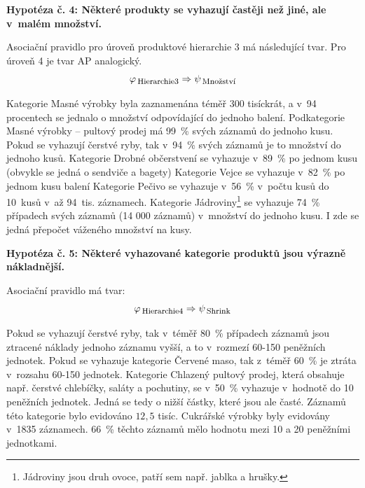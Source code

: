 
\textbf{Hypotéza č. 4: Některé produkty se vyhazují častěji než jiné, ale v~malém množství.}

Asociační pravidlo pro úroveň produktové hierarchie 3 má následující tvar. Pro úroveň 4 je tvar AP analogický.
\begin{equation}
    \varphi_{\mbox{\,\footnotesize Hierarchie3}} \Rightarrow \psi_{\mbox{\,\footnotesize Množství}}
\end{equation}

Kategorie Masné výrobky byla zaznamenána téměř 300 tisíckrát, a v~94 procentech se jednalo o množství odpovídající do jednoho balení. Podkategorie Masné výrobky -- pultový prodej má 99~\% svých záznamů do jednoho kusu.
Pokud se vyhazují čerstvé ryby, tak v~94~\% svých záznamů je to množství do jednoho kusů. Kategorie Drobné občerstvení %
 se vyhazuje v~89~\% po jednom kusu (obvykle se jedná o sendviče a bagety)
Kategorie Vejce se vyhazuje v~82~\% po jednom kusu balení
Kategorie Pečivo se vyhazuje v~56~\% v~počtu kusů do 10~kusů v~až 94~tis. záznamech.
Kategorie Jádroviny\footnote{Jádroviny jsou druh ovoce, patří sem např. jablka a hrušky.} se vyhazuje 74~\% případech svých záznamů (14 000 záznamů) v~množství do jednoho kusu. I zde se jedná přepočet váženého množství na kusy.

\vspace*{1em}

\textbf{Hypotéza č. 5: Některé vyhazované kategorie produktů jsou výrazně nákladnější.}

Asociační pravidlo má tvar:
\begin{equation}
    \varphi_{\mbox{\,\footnotesize Hierarchie4}} \Rightarrow \psi_{\mbox{\,\footnotesize Shrink}}
\end{equation}

Pokud se vyhazují čerstvé ryby, tak v~téměř 80~\% případech záznamů jsou ztracené náklady jednoho záznamu vyšší, a to v~rozmezí 60-150 peněžních jednotek.
Pokud se vyhazuje kategorie Červené maso, tak z~téměř 60~\% je ztráta v~rozsahu 60-150 jednotek.
Kategorie Chlazený pultový prodej, která obsahuje např. čerstvé chlebíčky, saláty a pochutiny, se v~50~\% vyhazuje v~hodnotě do 10 peněžních jednotek. Jedná se tedy o nižší částky, které jsou ale časté. Záznamů této kategorie bylo evidováno $12{,}5$ tisíc.
Cukrářské výrobky byly evidovány v~1835 záznamech. 66~\% těchto záznamů mělo hodnotu mezi 10 a 20 peněžními jednotkami.

